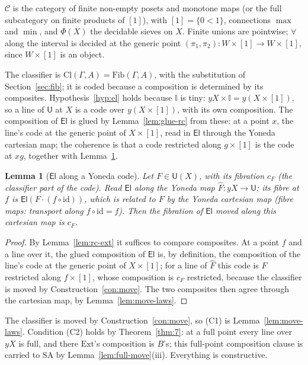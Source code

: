 \documentclass[11pt]{article}
\newcommand{\I}{\mathbb{I}}
\newcommand{\C}{\mathcal{C}}
\newcommand{\U}{\mathsf{U}}
\newcommand{\El}{\mathsf{El}}
\newcommand{\Ext}{\mathrm{Ext}}
\newcommand{\Fib}{\mathrm{Fib}}
\newcommand{\Cl}{\mathrm{Cl}}
\newcommand{\SA}{\mathrm{SA}}
\theoremstyle{plain}
\newtheorem{lemma}[theorem]{Lemma}
\theoremstyle{definition}
\theoremstyle{remark}
\begin{document}
$\C$ is the category of finite non-empty posets and monotone maps (or the
full subcategory on finite products of $[1]$), with $[1]=\{0<1\}$,
connections $\max$ and $\min$, and $\Phi(X)$ the decidable sieves on $X$.
Finite unions are pointwise; $\forall$ along the interval is decided at
the generic point $(\pi_1,\pi_2):W\times[1]\to W\times[1]$, since
$W\times[1]$ is an object.

The classifier is $\Cl(\Gamma,A)=\Fib(\Gamma,A)$, with the substitution of
Section~\ref{sec:fib}; it is coded because a composition is determined by
its composites. Hypothesis~\ref{hyp:el} holds because $\I$ is tiny:
$yX\times\I=y(X\times[1])$, so a line of $\U$ at $X$ is a code over
$y(X\times[1])$, with its own composition. The composition of $\El$ is
glued by Lemma~\ref{lem:glue-rc} from these: at a point $x$, the line's
code at the generic point of $X\times[1]$, read in $\El$ through the
Yoneda cartesian map; the coherence is that a code restricted along
$g\times[1]$ is the code at $xg$, together with Lemma~\ref{lem:el-yon}.

\begin{lemma}[$\El$ along a Yoneda code]\label{lem:el-yon}
Let $F\in\U(X)$, with its fibration $c_F$ (the classifier part of the
code). Read $\El$ along the Yoneda map $\hat F:yX\to\U$; its fibre at
$f$ is $\El(F\cdot(f\circ\mathrm{id}))$, which is related to $F$ by the
Yoneda cartesian map (fibre maps: transport along $f\circ\mathrm{id}=f$).
Then the fibration of $\El$ moved along this cartesian map is $c_F$.
\end{lemma}

\begin{proof}
By Lemma~\ref{lem:rc-ext} it suffices to compare composites. At a point
$f$ and a line over it, the glued composition of $\El$ is, by
definition, the composition of the line's code at the generic point of
$X\times[1]$; for a line of $\hat F$ this code is $F$ restricted along
$f\times[1]$, whose composition is $c_F$ restricted, because the
classifier is moved by Construction~\ref{con:move}. The two composites
then agree through the cartesian map, by Lemma~\ref{lem:move-laws}.
\end{proof} The classifier is moved by
Construction~\ref{con:move}, so (C1) is Lemma~\ref{lem:move-laws}. Condition (C2)
holds by Theorem~\ref{thm:7}: at a full point every line over $yX$ is
full, and there $\Ext$'s composition is $B$'s; this full-point
composition clause is carried to $\SA$ by Lemma~\ref{lem:full-move}(iii).
Everything is constructive.
\end{document}
